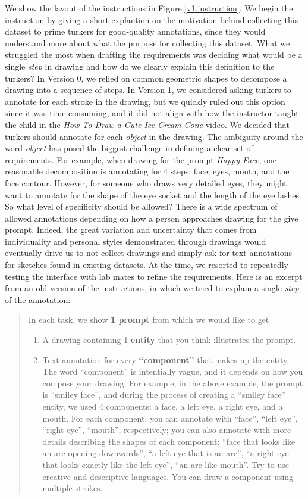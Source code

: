 We show the layout of the instructions in Figure \ref{v1.instruction}. We begin the instruction by giving a short explantion on the motivation behind collecting this dataset to prime turkers for good-quality annotations, since they would understand more about what the purpose for collecting this dataset. What we struggled the most when drafting the requirements was deciding what would be a single \textit{step} in drawing and how do we clearly explain this definition to the turkers? In Version 0, we relied on common geometric shapes to decompose a drawing into a sequence of steps. In Version 1, we considered asking turkers to annotate for each stroke in the drawing, but we quickly ruled out this option since it was time-consuming, and it did not align with how the instructor taught the child in the \textit{How To Draw a Cute Ice-Cream Cone} video. We decided that turkers should annotate for each \textit{object} in the drawing. The ambiguity around the word \textit{object} has posed the biggest challenge in defining a clear set of requirements. For example, when drawing for the prompt \textit{Happy Face}, one reasonable decomposition is annotating for 4 steps: face, eyes, mouth, and the face contour. However, for someone who draws very detailed eyes, they might want to annotate for the shape of the eye socket and the length of the eye lashes. So what level of specificity should be allowed?  
There is a wide spectrum of allowed annotations depending on how a person approaches drawing for the give prompt. Indeed, the great variation and uncertainty that comes from individuality and personal styles demonstrated through drawings would eventually drive us to not collect drawings and simply ask for text annotations for sketches found in existing datasets.  
At the time, we resorted to repeatedly testing the interface with lab mates to refine the requirements. Here is an excerpt from an old version of the instructions, in which we tried to explain a single \textit{step} of the annotation:
\begin{quotation}
In each task, we show \textbf{1 prompt} from which we would like to get
\begin{enumerate}
    \item A drawing containing 1 \textbf{entity} that you think illustrates the prompt.
    \item Text annotation for every \textbf{``component''} that makes up the entity.
    The word ``component'' is intentially vague, and it depends on how you compose your drawing. For example, in the above example, the prompt is ``smiley face'', and during the process of creating a ``smiley face'' entity, we used 4 components: a face, a left eye, a right eye, and a mouth. For each component, you can annotate with ``face'', ``left eye'', ``right eye'', ``mouth'', respectively; you can also annotate with more details describing the shapes of each component: ``face that looks like an arc opening downwards'', ``a left eye that is an arc'', ``a right eye that looks exactly like the left eye'', ``an arc-like mouth''. Try to use creative and descriptive languages. You can draw a component using multiple strokes.
\end{enumerate}
\end{quotation}
